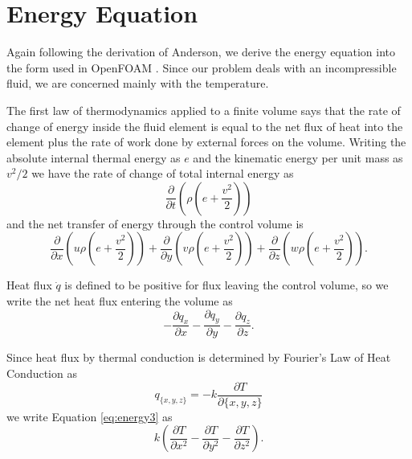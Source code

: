 \documentclass[12pt]{report}
\begin{document}
\section{Energy Equation}

Again following the derivation of Anderson, we derive the energy equation into the form used in OpenFOAM .
Since our problem deals with an incompressible fluid, we are concerned mainly with the temperature.

The first law of thermodynamics applied to a finite volume says that the rate of change of energy inside the fluid element is equal to the net flux of heat into the element plus the rate of work done by external forces on the volume.
Writing the absolute internal thermal energy as $e$ and the kinematic energy per unit mass as $v^2/2$ we have the rate of change of total internal energy as
\begin{equation} \frac{\partial}{\partial t} \left ( \rho \left ( e + \frac{v^2}{2} \right ) \right ) \label{eq:energy1} \end{equation}
and the net transfer of energy through the control volume is
\begin{equation} \frac{\partial}{\partial x} \left ( u \rho \left ( e + \frac{v^2}{2} \right ) \right ) + \frac{\partial}{\partial y} \left ( v \rho \left ( e + \frac{v^2}{2} \right ) \right ) + \frac{\partial}{\partial z} \left ( w \rho \left ( e + \frac{v^2}{2} \right ) \right ) \label{eq:energy2} .\end{equation}

Heat flux $\dot{q}$ is defined to be positive for flux leaving the control volume, so we write the net heat flux entering the volume as
\begin{equation} - \frac{\partial q_x}{\partial x} - \frac{\partial q_y}{\partial y} - \frac{\partial q_z}{\partial z} \label{eq:energy3}.\end{equation}

Since heat flux by thermal conduction is determined by Fourier's Law of Heat Conduction as
\begin{equation} q_{\{x,y,z\}} = -k \frac{\partial T}{\partial \{x,y,z\}} \label{eq:energy6} \end{equation}
we write Equation \ref{eq:energy3} as
\begin{equation} k\left ( \frac{\partial T}{\partial x^2} - \frac{\partial T}{\partial y^2} - \frac{\partial T}{\partial z^2} \label{eq:energy5} \right ).\end{equation}
\end{document}

